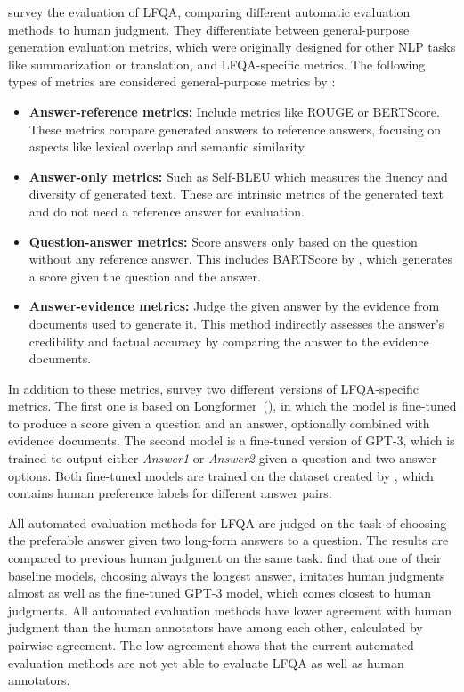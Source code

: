 \cite{xu:2023:A} survey the evaluation of LFQA, comparing different automatic evaluation methods to human judgment.
They differentiate between general-purpose generation evaluation metrics, which were originally designed for other NLP tasks like summarization or translation, and LFQA-specific metrics.
The following types of metrics are considered general-purpose metrics by \cite{xu:2023:A}:
\begin{itemize}
\item \textbf{Answer-reference metrics:} Include metrics like ROUGE or BERTScore. These metrics compare generated answers to reference answers, focusing on aspects like lexical overlap and semantic similarity.
\item \textbf{Answer-only metrics:} Such as Self-BLEU which measures the fluency and diversity of generated text. These are intrinsic metrics of the generated text and do not need a reference answer for evaluation.
\item \textbf{Question-answer metrics:} Score answers only based on the question without any reference answer. This includes BARTScore by \cite{yuan:2021:bartscore}, which generates a score given the question and the answer.
\item \textbf{Answer-evidence metrics:} Judge the given answer by the evidence from documents used to generate it. This method indirectly assesses the answer's credibility and factual accuracy by comparing the answer to the evidence documents.
\end{itemize}
In addition to these metrics, \cite{xu:2023:A} survey two different versions of LFQA-specific metrics.
The first one is based on Longformer~(\cite{beltagy:2020:Longformer}), in which the model is fine-tuned to produce a score given a question and an answer, optionally combined with evidence documents.
The second model is a fine-tuned version of GPT-3, which is trained to output either \emph{Answer1} or \emph{Answer2} given a question and two answer options.
Both fine-tuned models are trained on the dataset created by \cite{nakano:2021:Webgpt}, which contains human preference labels for different answer pairs.

All automated evaluation methods for LFQA are judged on the task of choosing the preferable answer given two long-form answers to a question.
The results are compared to previous human judgment on the same task.
\cite{xu:2023:A} find that one of their baseline models, choosing always the longest answer, imitates human judgments almost as well as the fine-tuned GPT-3 model, which comes closest to human judgments.
All automated evaluation methods have lower agreement with human judgment than the human annotators have among each other, calculated by pairwise agreement.
The low agreement shows that the current automated evaluation methods are not yet able to evaluate LFQA as well as human annotators.

